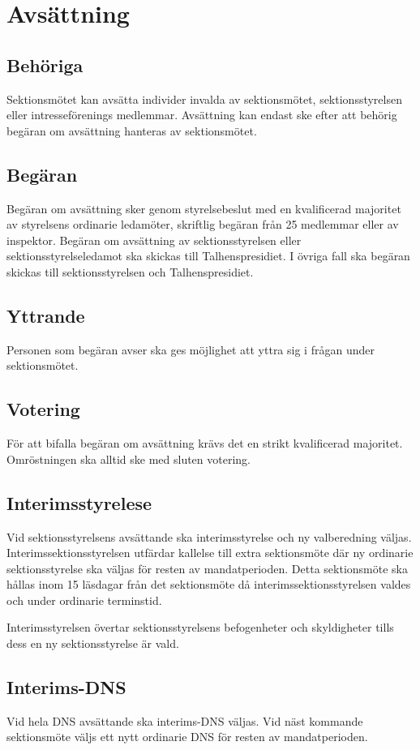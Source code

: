\section{Avsättning}
\subsection{Behöriga}
Sektionsmötet kan avsätta individer invalda av sektionsmötet, sektionsstyrelsen eller intresseförenings medlemmar.
Avsättning kan endast ske efter att behörig begäran om avsättning hanteras av sektionsmötet.
\subsection{Begäran}
Begäran om avsättning sker genom styrelsebeslut med en kvalificerad majoritet av styrelsens ordinarie ledamöter, skriftlig begäran från 25 medlemmar eller av inspektor.
Begäran om avsättning av sektionsstyrelsen eller sektionsstyrelseledamot ska skickas till Talhenspresidiet.
I övriga fall ska begäran skickas till sektionsstyrelsen och Talhenspresidiet.
\subsection{Yttrande}
Personen som begäran avser ska ges möjlighet att yttra sig i frågan under sektionsmötet.
\subsection{Votering}
För att bifalla begäran om avsättning krävs det en strikt kvalificerad majoritet.
Omröstningen ska alltid ske med sluten votering.
\subsection{Interimsstyrelese}
Vid sektionsstyrelsens avsättande ska interimsstyrelse och ny valberedning väljas.
Interimssektionsstyrelsen utfärdar kallelse till extra sektionsmöte där ny ordinarie sektionsstyrelse ska väljas för resten av mandatperioden.
Detta sektionsmöte ska hållas inom 15 läsdagar från det sektionsmöte då interimssektionsstyrelsen valdes och under ordinarie terminstid.

Interimsstyrelsen övertar sektionsstyrelsens befogenheter och skyldigheter tills dess en ny sektionsstyrelse är vald.
\subsection{Interims-DNS}
Vid hela DNS avsättande ska interims-DNS väljas.
Vid näst kommande sektionsmöte väljs ett nytt ordinarie DNS för resten av mandatperioden.

